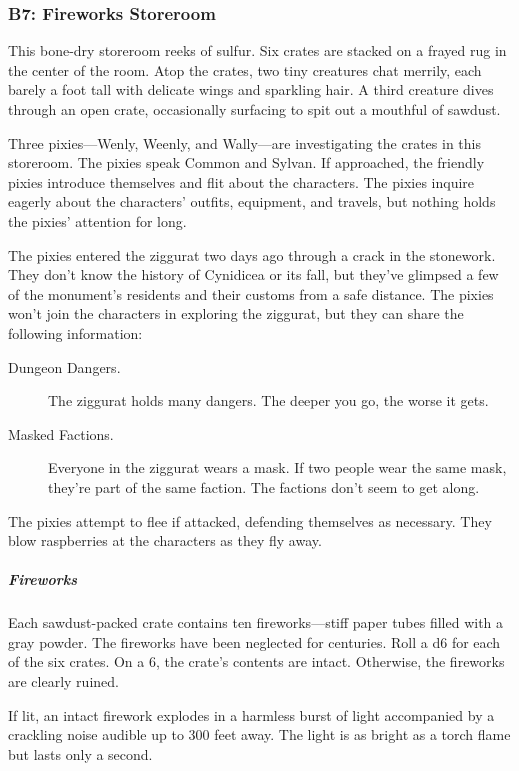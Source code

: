 \documentclass[10pt,a4paper,twoside,bg=print,twocolumn,openany,nodeprecatedcode]{dndbook}
\begin{document}
\subsubsection{B7: Fireworks Storeroom}
\begin{DndReadAloud}{}
This bone-dry storeroom reeks of sulfur. Six crates are stacked on a frayed rug in the center of the room. Atop the crates, two tiny creatures chat merrily, each barely a foot tall with delicate wings and sparkling hair. A third creature dives through an open crate, occasionally surfacing to spit out a mouthful of sawdust.

\end{DndReadAloud}

Three pixies—Wenly, Weenly, and Wally—are investigating the crates in this storeroom. The pixies speak Common and Sylvan. If approached, the friendly pixies introduce themselves and flit about the characters. The pixies inquire eagerly about the characters' outfits, equipment, and travels, but nothing holds the pixies' attention for long.

The pixies entered the ziggurat two days ago through a crack in the stonework. They don't know the history of Cynidicea or its fall, but they've glimpsed a few of the monument's residents and their customs from a safe distance. The pixies won't join the characters in exploring the ziggurat, but they can share the following information:


\begin{description}
\item[Dungeon Dangers.]
The ziggurat holds many dangers. The deeper you go, the worse it gets.
\item[Masked Factions.]
Everyone in the ziggurat wears a mask. If two people wear the same mask, they're part of the same faction. The factions don't seem to get along.
\end{description}

The pixies attempt to flee if attacked, defending themselves as necessary. They blow raspberries at the characters as they fly away.

\subparagraph{Fireworks}
Each sawdust-packed crate contains ten fireworks—stiff paper tubes filled with a gray powder. The fireworks have been neglected for centuries. Roll a d6 for each of the six crates. On a 6, the crate's contents are intact. Otherwise, the fireworks are clearly ruined.

If lit, an intact firework explodes in a harmless burst of light accompanied by a crackling noise audible up to 300 feet away. The light is as bright as a torch flame but lasts only a second.
\end{document}
